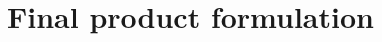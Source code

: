 \setlength{\headheight}{13.6pt}
\addtolength{\topmargin}{-1.6pt}
\newpage
\section{Final product formulation}